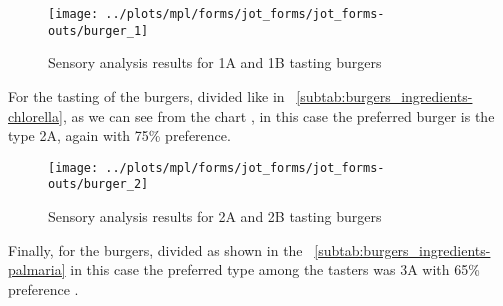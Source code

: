 \begin{figure}[H]
\scriptsize
	\begin{minipage}[b]{0.475\textwidth}%
	\centering%
	\end{minipage}%
\hspace*{0.05\textwidth}%
	\begin{minipage}[b]{0.475\textwidth}%
	\centering%
		\texttt{[image: ../plots/mpl/forms/jot\_forms/jot\_forms-outs/burger\_1]}%
	\caption{Sensory analysis results for  1A and 1B tasting burgers\label{subfig:sens_analysis-spirulina}}%
	\end{minipage}%
\end{figure}


For the tasting of the  burgers, divided like in \tab{}~\ref{subtab:burgers_ingredients-chlorella}, as we can see from the chart , in this case the preferred burger is the type 2A, again with \num{75}\% preference.

\begin{figure}[H]
\scriptsize
	\begin{minipage}[b]{0.475\textwidth}%
	\centering%
	\end{minipage}%
\hspace*{0.05\textwidth}%
	\begin{minipage}[b]{0.475\textwidth}%
	\centering%
		\texttt{[image: ../plots/mpl/forms/jot\_forms/jot\_forms-outs/burger\_2]}%
	\caption{Sensory analysis results for  2A and 2B tasting burgers\label{subfig:sens_analysis-chlorella}}%
	\end{minipage}%
\end{figure}


Finally, for the  burgers, divided as shown in the \tab{}~\ref{subtab:burgers_ingredients-palmaria} in this case the preferred type among the tasters was 3A with \num{65}\% preference .

